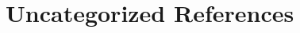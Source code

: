 \documentclass{article}
\theoremstyle{definition}
\begin{document}

\section{Uncategorized References}




\newpage


\end{document}
